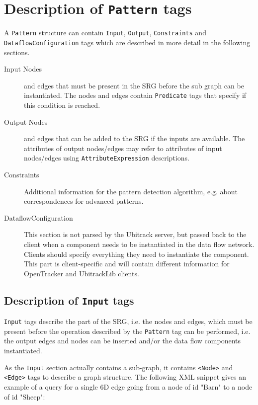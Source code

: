 \documentclass[11pt]{article}
\begin{document}
\section{Description of \texttt{Pattern} tags}
\label{pattern}

A \texttt{Pattern} structure can contain \texttt{Input}, \texttt{Output}, \texttt{Constraints} and \texttt{Data\-flow\-Configuration}
tags which are described in more detail in the following sections.

\begin{description}
\item[Input Nodes]
and edges that must be present in the SRG before the sub graph can be
instantiated. The nodes and edges contain 
\texttt{Predicate} tags that
specify if this condition is reached.

\item[Output Nodes]
and edges that can be added to the SRG if the inputs are available. The
attributes of output nodes/edges may refer to attributes of input nodes/edges
using \texttt{AttributeExpression}
 descriptions.

\item[Constraints]
Additional information for the pattern detection algorithm, e.g. about
correspondences for advanced patterns.

\item[DataflowConfiguration]
This section is not parsed by the Ubitrack server, but passed back
to the client when a component needs to be instantiated in the data flow
network. Clients should specify everything they need to instantiate the
component. This part is client-specific and will contain different information
for OpenTracker and UbitrackLib clients.
\end{description}

\subsection{Description of \texttt{Input} tags}
\label{input}

\texttt{Input} tags describe the part of the SRG, i.e. the nodes and edges, which
must be present before the operation described by the \texttt{Pattern} tag can be
performed, i.e. the output edges and nodes can be inserted and/or the data flow
components instantiated.

As the \texttt{Input} section actually contains a sub-graph, it contains 
\texttt{<Node>} and \texttt{<Edge>} tags to describe a graph structure. The following XML snippet gives
an example of a query for a single 6D edge going from a node of id "Barn" to a
node of id "Sheep":
\end{document}
